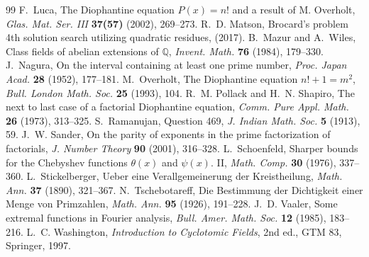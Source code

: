 \documentclass[11pt,reqno]{amsart}
\theoremstyle{remark}
\newcommand{\Q}{\mathbb{Q}}
\begin{document}
\begin{thebibliography}{99}
 F.~Luca, The Diophantine equation $P(x) = n!$ and a result of M. Overholt, \emph{Glas. Mat. Ser. III} \textbf{37(57)} (2002), 269--273.
 R.~D. Matson, Brocard's problem 4th solution search utilizing quadratic residues, (2017).
 B.~Mazur and A.~Wiles, Class fields of abelian extensions of $\Q$, \emph{Invent. Math.} \textbf{76} (1984), 179--330.
 J.~Nagura, On the interval containing at least one prime number, \emph{Proc. Japan Acad.} \textbf{28} (1952), 177--181.
 M.~Overholt, The Diophantine equation $n! + 1 = m^2$, \emph{Bull. London Math. Soc.} \textbf{25} (1993), 104.
 R.~M. Pollack and H.~N. Shapiro, The next to last case of a factorial Diophantine equation, \emph{Comm. Pure Appl. Math.} \textbf{26} (1973), 313--325.
 S.~Ramanujan, Question 469, \emph{J. Indian Math. Soc.} \textbf{5} (1913), 59.
 J.~W. Sander, On the parity of exponents in the prime factorization of factorials, \emph{J. Number Theory} \textbf{90} (2001), 316--328.
 L.~Schoenfeld, Sharper bounds for the Chebyshev functions $\theta(x)$ and $\psi(x)$. II, \emph{Math. Comp.} \textbf{30} (1976), 337--360.
 L.~Stickelberger, Ueber eine Verallgemeinerung der Kreistheilung, \emph{Math. Ann.} \textbf{37} (1890), 321--367.
 N.~Tschebotareff, Die Bestimmung der Dichtigkeit einer Menge von Primzahlen, \emph{Math. Ann.} \textbf{95} (1926), 191--228.
 J.~D. Vaaler, Some extremal functions in Fourier analysis, \emph{Bull. Amer. Math. Soc.} \textbf{12} (1985), 183--216.
 L.~C. Washington, \emph{Introduction to Cyclotomic Fields}, 2nd ed., GTM 83, Springer, 1997.
\end{thebibliography}
\end{document}
